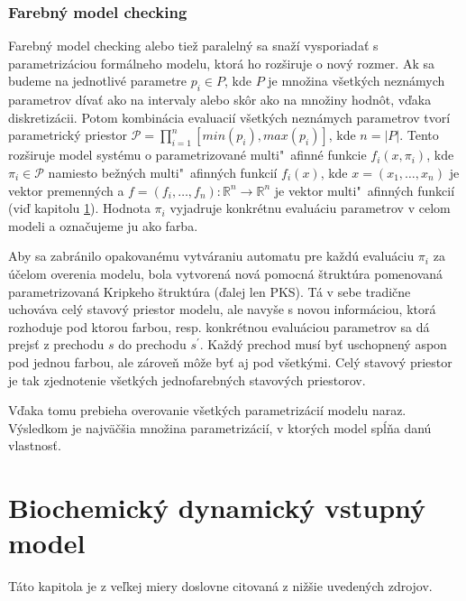 \documentclass[11pt,final,oneside]{fithesis}
\begin{document}
\subsection{Farebn\' y model checking}
\label{sec:coloredMC}
Farebn\'y model checking alebo tie\v z paraleln\'y sa sna\v z\'i vysporiada\v t s parametriz\'aciou form\'alneho modelu, ktor\'a ho roz\v siruje o nov\'y
rozmer. Ak sa budeme na jednotliv\'e parametre $p_i \in P$, kde $P$ je mno\v zina v\v setk\'ych nezn\'amych parametrov d\'iva\v t ako na intervaly alebo 
sk\^ or ako na mno\v ziny hodn\^ ot, v\v daka diskretiz\'acii. Potom kombin\'acia evaluaci\'i v\v setk\'ych nezn\'amych parametrov tvor\'i parametrick\'y
priestor $\mathcal{P} = \prod_{i = 1}^n [min(p_i),max(p_i)]$, kde $n = |P|$. Tento roz\v siruje model syst\'emu o parametrizovan\'e multi"~afinn\'e funkcie 
$f_i(x,\pi_i)$, kde $\pi_i \in \mathcal{P}$ namiesto be\v zn\'ych multi"~afinn\'ych funkci\'i $f_i(x)$, kde $x = (x_1,\dots{},x_n)$ je vektor premenn\'ych
a $f = (f_i,\dots{},f_n) : \mathbb{R}^n \rightarrow \mathbb{R}^n$ je vektor multi"~afinn\'ych funkci\'i (vi\v d kapitolu \ref{sec:model}). Hodnota $\pi_i$
vyjadruje konkr\'etnu evalu\'aciu parametrov v celom modeli a ozna\v cujeme ju ako farba.

Aby sa zabr\'anilo opakovan\'emu vytv\'araniu automatu pre ka\v zd\'u evalu\'aciu $\pi_i$ za \'u\v celom overenia modelu, bola vytvoren\'a nov\'a pomocn\'a
\v strukt\'ura pomenovan\'a parametrizovan\'a Kripkeho \v strukt\'ura (\v dalej len PKS). T\'a v sebe tradi\v cne uchov\'ava cel\'y stavov\'y priestor modelu,
ale navy\v se s novou inform\'aciou, ktor\'a rozhoduje pod ktorou farbou, resp. konkr\'etnou evalu\'aciou parametrov sa d\'a prejs\v t z prechodu $s$ 
do prechodu $s^{'}$. Ka\v zd\'y prechod mus\'i by\v t uschopnen\'y aspon pod jednou farbou, ale z\'arove\v n m\^ o\v ze by\v t aj pod v\v setk\'ymi. Cel\'y
stavov\'y priestor je tak zjednotenie v\v setk\'ych jednofarebn\'ych stavov\'ych priestorov.

V\v daka tomu prebieha overovanie v\v setk\'ych parametriz\'aci\'i modelu naraz. V\'ysledkom je najv\"a\v c\v sia mno\v zina parametriz\'aci\'i, v ktor\'ych
model sp\'l\v na dan\'u vlastnos\v t. \cite{TCBB-2010}

\chapter{Biochemick\'y dynamick\'y vstupn\'y model}
\label{sec:model}
T\'ato kapitola je z ve\v lkej miery doslovne citovan\'a z ni\v z\v sie uveden\'ych zdrojov.
\\
\end{document}
